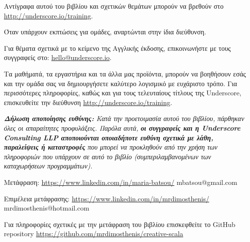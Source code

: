 \begin{center}

Αντίγραφα αυτού του βιβλίου και σχετικών θεμάτων μπορούν να βρεθούν στο \href{http://underscore.io/training}{http://underscore.io/training}.

Όταν υπάρχουν εκπτώσεις για ομάδες, αναρτώνται στην ίδια διεύθυνση.

Για θέματα σχετικά με το κείμενο της Αγγλικής έκδοσης, επικοινωνήστε με τους συγγραφείς στο: \href{mailto:hello@underscore.io}{hello@underscore.io}.

\vspace{3em}

Τα μαθήματά, τα εργαστήρια και τα άλλα μας προϊόντα, μπορούν να βοηθήσουν εσάς και την ομάδα σας να δημιουργήσετε καλύτερο λογισμικό με ευχάριστο τρόπο. Για περισσότερες πληροφορίες, καθώς και για τους τελευταίους τίτλους της Underscore, επισκευθείτε την διεύθυνση \href{http://underscore.io/training}{http://underscore.io/training}.

\vspace{3em}

\textit{\textbf{Δήλωση αποποίησης ευθύνης:} Κατά την προετοιμασία αυτού του βιβλίου, πάρθηκαν όλες οι απαραίτητες προφυλάξεις. Παρόλα αυτά, \textbf{οι συγγραφείς και η Underscore Consulting LLP αποποιούνται οποιαδήποτε ευθύνη σχετικά με λάθη, παραλείψεις ή καταστροφές} που μπορεί να προκληθούν από την χρήση των πληροφοριών που υπάρχουν σε αυτό το βιβλίο (συμπεριλαμβανομένων των καταχωρήσεων προγραμμάτων).}

\vspace{3em}

Μετάφραση: \href{Μαρία Μπάτσου}{https://www.linkedin.com/in/maria-batsou/} mbatsou@gmail.com

Επιμέλεια μετάφρασης: \href{Δημοσθένης Μιχαηλίδης}{https://www.linkedin.com/in/mrdimosthenis/} mrdimosthenis@hotmail.com

Για πληροφορίες σχετικές με την μετάφραση του βιβλίου επισκεφθείτε το GitHub repository \href{mrdimosthenis/creative-scala}{https://github.com/mrdimosthenis/creative-scala}

\end{center}
